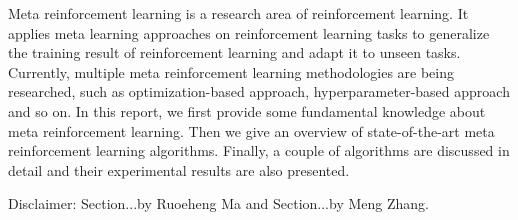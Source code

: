 Meta reinforcement learning is a research area of reinforcement learning. It applies meta learning approaches on reinforcement learning tasks to generalize the training result of reinforcement learning and adapt it to unseen tasks. Currently, multiple meta reinforcement learning methodologies are being researched, such as optimization-based approach, hyperparameter-based approach and so on. In this report, we first provide some fundamental knowledge about meta reinforcement learning. Then we give an overview of state-of-the-art meta reinforcement learning algorithms. Finally, a couple of algorithms are discussed in detail and their experimental results are also presented.\par
Disclaimer: {\normalfont Section...by Ruoeheng Ma and Section...by Meng Zhang.}